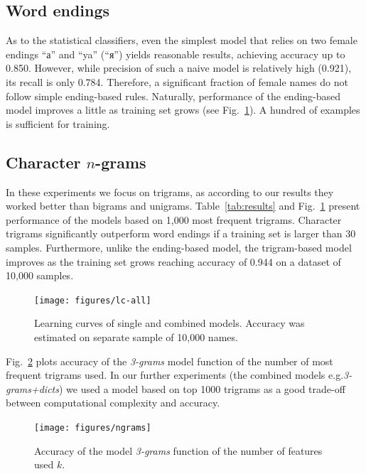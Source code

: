 \documentclass[runningheads,a4paper]{llncs}
\newcommand\textcyr[1]{{\fontencoding{OT2}\fontfamily{wncyr}\selectfont #1}}
\begin{document}
\subsection{Word endings} As to the statistical classifiers, even the simplest model that relies on two female endings ``\textcyr{а}'' and ``ya'' (``\textcyr{я}'') yields reasonable results, achieving accuracy up to 0.850.  However, while precision of such a naive model is relatively high (0.921), its recall is only 0.784. Therefore, a significant fraction of female names do not follow simple ending-based rules. Naturally, performance of the ending-based model improves a little as training set grows (see Fig.~\ref{fig:curve}). A hundred of examples is sufficient for training.  

\subsection{Character $n$-grams}
In these experiments we focus on trigrams, as according to our results they worked better than bigrams and unigrams. Table~\ref{tab:results} and Fig.~\ref{fig:curve} present performance of the models based on 1,000 most frequent trigrams. Character trigrams  significantly outperform word endings if a training set is larger than 30 samples. Furthermore, unlike the ending-based model, the trigram-based model  improves as the training set grows reaching accuracy of 0.944 on a dataset of 10,000 samples.

\begin{figure}
	\centering
	\texttt{[image: figures/lc-all]} 
	\caption{ Learning curves of single and combined models. Accuracy was estimated on separate sample of 10,000 names.  }
	\label{fig:curve}
\end{figure}

Fig.~\ref{fig:ngrams} plots accuracy of the  \textit{3-grams} model function of the number of most frequent trigrams used. In our further experiments (the combined models e.g.\textit{3-grams+dicts}) we used a model based on top 1000 trigrams as a good trade-off between computational complexity and accuracy. 

\begin{figure}
\centering
\texttt{[image: figures/ngrams]} 
\caption{ Accuracy of the model \textit{3-grams} function of the number of features used $k$. }
\label{fig:ngrams}
\end{figure}
\end{document}
